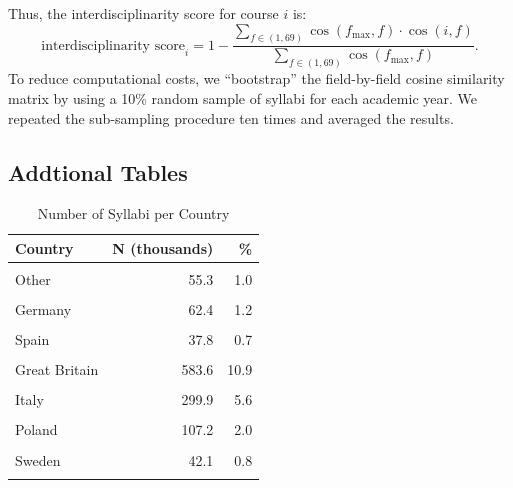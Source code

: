 \documentclass[
  12pt,
]{article}
\begin{document}
Thus, the interdisciplinarity score for course \(i\) is:
\[
  \text{interdisciplinarity score}_i = 1 - \frac{\sum_{f \in (1, 69)} \cos(f_{\max}, f) \cdot \cos(i, f)}{\sum_{f \in (1, 69)} \cos(f_{\max}, f)}. 
\]
To reduce computational costs, we ``bootstrap'' the field-by-field cosine similarity matrix by using a 10\% random sample of syllabi for each academic year. We repeated the sub-sampling procedure ten times and averaged the results.

\clearpage

\subsection{Addtional Tables}\label{addtional-tables}

\begin{table}[!h]
\centering
\caption{\label{tab:SI-country}Number of Syllabi per Country}
\centering
\fontsize{10}{12}\selectfont
\begin{tabular}[t]{lrr}
\toprule
Country & N (thousands) & \%\\
\midrule
\cellcolor{gray!10}{Austria} & \cellcolor{gray!10}{33.3} & \cellcolor{gray!10}{0.6}\\
Other & 55.3 & 1.0\\
\cellcolor{gray!10}{Canada} & \cellcolor{gray!10}{389.8} & \cellcolor{gray!10}{7.3}\\
Germany & 62.4 & 1.2\\
\cellcolor{gray!10}{Denmark} & \cellcolor{gray!10}{24.3} & \cellcolor{gray!10}{0.5}\\
Spain & 37.8 & 0.7\\
\cellcolor{gray!10}{France} & \cellcolor{gray!10}{5.9} & \cellcolor{gray!10}{0.1}\\
Great Britain & 583.6 & 10.9\\
\cellcolor{gray!10}{Ireland} & \cellcolor{gray!10}{50.9} & \cellcolor{gray!10}{0.9}\\
Italy & 299.9 & 5.6\\
\cellcolor{gray!10}{Netherlands} & \cellcolor{gray!10}{86.5} & \cellcolor{gray!10}{1.6}\\
Poland & 107.2 & 2.0\\
\cellcolor{gray!10}{Portugal} & \cellcolor{gray!10}{42.1} & \cellcolor{gray!10}{0.8}\\
Sweden & 42.1 & 0.8\\
\cellcolor{gray!10}{USA} & \cellcolor{gray!10}{3554.1} & \cellcolor{gray!10}{66.1}\\
\bottomrule
\end{tabular}
\end{table}
\end{document}
